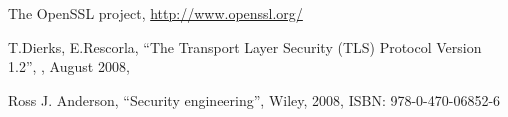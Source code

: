 \begin{thebibliography}{9}
The OpenSSL project,
\url{http://www.openssl.org/}

T.Dierks, E.Rescorla,
``The Transport Layer Security (TLS) Protocol Version 1.2'',
, August 2008,

Ross J. Anderson,
``Security engineering'',
Wiley, 2008,
ISBN: 978-0-470-06852-6

\end{thebibliography}
